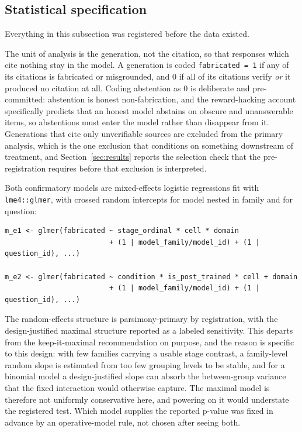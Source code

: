 \subsection{Statistical specification}

Everything in this subsection was registered before the data existed.

The unit of analysis is the generation, not the citation, so that responses
which cite nothing stay in the model. A generation is coded \texttt{fabricated =
1} if any of its citations is fabricated or misgrounded, and 0 if all of its
citations verify \emph{or} it produced no citation at all. Coding abstention as
0 is deliberate and pre-committed: abstention is honest non-fabrication, and the
reward-hacking account specifically predicts that an honest model abstains on
obscure and unanswerable items, so abstentions must enter the model rather than
disappear from it. Generations that cite only unverifiable sources are excluded
from the primary analysis, which is the one exclusion that conditions on
something downstream of treatment, and Section~\ref{sec:results} reports the
selection check that the pre-registration requires before that exclusion is
interpreted.

Both confirmatory models are mixed-effects logistic regressions fit with
\texttt{lme4::glmer}, with crossed random intercepts for model nested in family
and for question:

\begin{verbatim}
m_e1 <- glmer(fabricated ~ stage_ordinal * cell * domain
                         + (1 | model_family/model_id) + (1 | question_id), ...)

m_e2 <- glmer(fabricated ~ condition * is_post_trained * cell + domain
                         + (1 | model_family/model_id) + (1 | question_id), ...)
\end{verbatim}

The random-effects structure is parsimony-primary by registration, with the
design-justified maximal structure reported as a labeled sensitivity. This
departs from the keep-it-maximal recommendation on purpose, and the reason is
specific to this design: with few families carrying a usable stage contrast, a
family-level random slope is estimated from too few grouping levels to be
stable, and for a binomial model a design-justified slope can absorb the
between-group variance that the fixed interaction would otherwise capture. The
maximal model is therefore not uniformly conservative here, and powering on it
would understate the registered test. Which model supplies the reported p-value
was fixed in advance by an operative-model rule, not chosen after seeing both.

